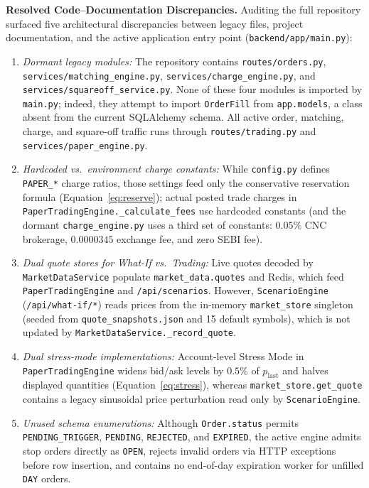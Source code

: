 \documentclass[12pt]{article}
\begin{document}
\textbf{Resolved Code--Documentation Discrepancies.} Auditing the full repository surfaced five architectural discrepancies between legacy files, project documentation, and the active application entry point (\texttt{backend/app/main.py}):
\begin{enumerate}
  \item \emph{Dormant legacy modules:} The repository contains \texttt{routes/orders.py}, \texttt{services/matching\_engine.py}, \texttt{services/charge\_engine.py}, and \texttt{services/squareoff\_service.py}. None of these four modules is imported by \texttt{main.py}; indeed, they attempt to import \texttt{OrderFill} from \texttt{app.models}, a class absent from the current SQLAlchemy schema. All active order, matching, charge, and square-off traffic runs through \texttt{routes/trading.py} and \texttt{services/paper\_engine.py}.
  \item \emph{Hardcoded vs.\ environment charge constants:} While \texttt{config.py} defines \texttt{PAPER\_*} charge ratios, those settings feed only the conservative reservation formula (Equation~\eqref{eq:reserve}); actual posted trade charges in \texttt{PaperTradingEngine.\_calculate\_fees} use hardcoded constants (and the dormant \texttt{charge\_engine.py} uses a third set of constants: $0.05\%$ CNC brokerage, $0.0000345$ exchange fee, and zero SEBI fee).
  \item \emph{Dual quote stores for What-If vs.\ Trading:} Live quotes decoded by \texttt{MarketDataService} populate \texttt{market\_data.quotes} and Redis, which feed \texttt{PaperTradingEngine} and \texttt{/api/scenarios}. However, \texttt{ScenarioEngine} (\texttt{/api/what-if/*}) reads prices from the in-memory \texttt{market\_store} singleton (seeded from \texttt{quote\_snapshots.json} and 15 default symbols), which is not updated by \texttt{MarketDataService.\_record\_quote}.
  \item \emph{Dual stress-mode implementations:} Account-level Stress Mode in \texttt{PaperTradingEngine} widens bid/ask levels by $0.5\%$ of $p_{\mathrm{last}}$ and halves displayed quantities (Equation~\eqref{eq:stress}), whereas \texttt{market\_store.get\_quote} contains a legacy sinusoidal price perturbation read only by \texttt{ScenarioEngine}.
  \item \emph{Unused schema enumerations:} Although \texttt{Order.status} permits \texttt{PENDING\_TRIGGER}, \texttt{PENDING}, \texttt{REJECTED}, and \texttt{EXPIRED}, the active engine admits stop orders directly as \texttt{OPEN}, rejects invalid orders via HTTP exceptions before row insertion, and contains no end-of-day expiration worker for unfilled \texttt{DAY} orders.
\end{enumerate}
\end{document}
